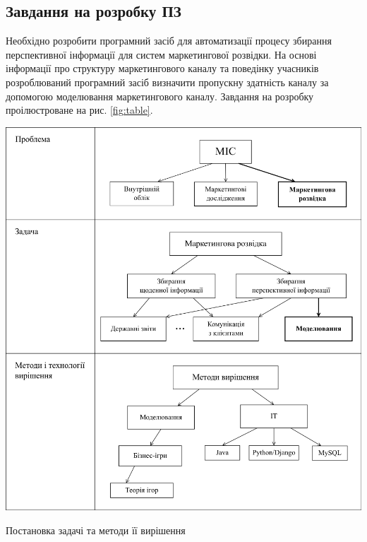 \subsection{Завдання на розробку ПЗ}
Необхідно розробити програмний засіб для автоматизації процесу збирання перспективної інформації для систем маркетингової розвідки. На основі інформації про структуру маркетингового каналу та поведінку учасників розроблюваний програмний засіб визначити пропускну здатність каналу за допомогою моделювання маркетингового каналу. Завдання на розробку проілюстроване на рис. \ref{fig:table}.
            \begin{stdfigure}
                \includegraphics[width=7in]{images/table.png}
                \caption{Постановка задачі та методи її вирішення}
                \label{fig:table}
            \end{stdfigure}
